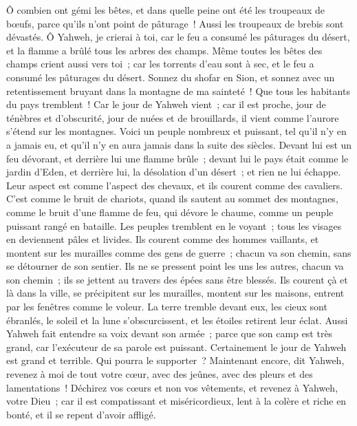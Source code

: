\begin{multicols}{2}
Ô combien ont gémi les bêtes, et dans quelle peine ont été les troupeaux de bœufs, parce qu'ils n'ont point de pâturage~! Aussi les troupeaux de brebis sont dévastés.
Ô Yahweh, je crierai à toi, car le feu a consumé les pâturages du désert, et la flamme a brûlé tous les arbres des champs.
Même toutes les bêtes des champs crient aussi vers toi~; car les torrents d'eau sont à sec, et le feu a consumé les pâturages du désert.
\VerseOne{}Sonnez du shofar en Sion, et sonnez avec un retentissement bruyant dans la montagne de ma sainteté~! Que tous les habitants du pays tremblent~! Car le jour de Yahweh vient~; car il est proche,
jour de ténèbres et d'obscurité, jour de nuées et de brouillards, il vient comme l'aurore s'étend sur les montagnes. Voici un peuple nombreux et puissant, tel qu'il n'y en a jamais eu, et qu'il n'y en aura jamais dans la suite des siècles.
Devant lui est un feu dévorant, et derrière lui une flamme brûle~; devant lui le pays était comme le jardin d'Eden, et derrière lui, la désolation d'un désert~; et rien ne lui échappe.
Leur aspect est comme l'aspect des chevaux, et ils courent comme des cavaliers.
C'est comme le bruit de chariots, quand ils sautent au sommet des montagnes, comme le bruit d'une flamme de feu, qui dévore le chaume, comme un peuple puissant rangé en bataille.
Les peuples tremblent en le voyant~; tous les visages en deviennent pâles et livides.
Ils courent comme des hommes vaillants, et montent sur les murailles comme des gens de guerre~; chacun va son chemin, sans se détourner de son sentier.
Ils ne se pressent point les uns les autres, chacun va son chemin~; ils se jettent au travers des épées sans être blessés.
Ils courent çà et là dans la ville, se précipitent sur les murailles, montent sur les maisons, entrent par les fenêtres comme le voleur.
La terre tremble devant eux, les cieux sont ébranlés, le soleil et la lune s'obscurcissent, et les étoiles retirent leur éclat.
Aussi Yahweh fait entendre sa voix devant son armée~; parce que son camp est très grand, car l'exécuteur de sa parole est puissant. Certainement le jour de Yahweh est grand et terrible. Qui pourra le supporter~?
Maintenant encore, dit Yahweh, revenez à moi de tout votre cœur, avec des jeûnes, avec des pleurs et des lamentations~!
Déchirez vos cœurs et non vos vêtements, et revenez à Yahweh, votre Dieu~; car il est compatissant et miséricordieux, lent à la colère et riche en bonté, et il se repent d'avoir affligé.

\end{multicols}
